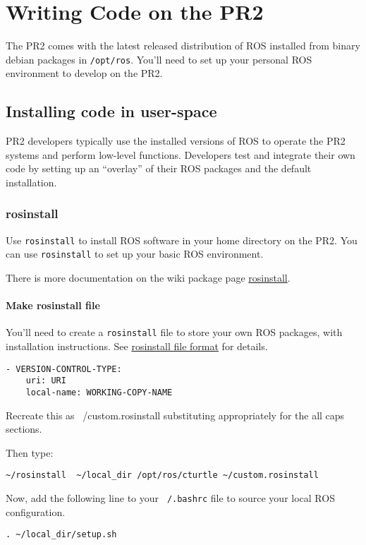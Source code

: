 \chapter{Writing Code on the PR2}

The PR2 comes with the latest released distribution
of ROS installed from binary debian packages in \texttt{/opt/ros}. You'll need to set up your personal ROS environment to develop on the PR2. 


\section{Installing code in user-space}

PR2 developers typically use the installed versions of ROS to operate the PR2 systems and perform low-level functions. Developers test and integrate their own code by setting up an ``overlay'' of their ROS packages and the default installation.

\subsection{rosinstall}

Use \texttt{rosinstall} to install ROS software in your home directory on the PR2. You can use \texttt{rosinstall} to set up your basic ROS environment.

There is more documentation on the wiki package page
\href{http://www.ros.org/wiki/rosinstall}{rosinstall}.

\subsubsection{Make rosinstall file}

You'll need to create a \texttt{rosinstall} file to store your own ROS packages, with installation instructions. See \href{http://www.ros.org/wiki/rosinstall#File\_format}{rosinstall file format} for details.

\begin{verbatim}
- VERSION-CONTROL-TYPE:
    uri: URI
    local-name: WORKING-COPY-NAME
\end{verbatim}
Recreate this as ~/custom.rosinstall substituting appropriately for the all caps sections. 

Then type:
\begin{verbatim}
~/rosinstall  ~/local_dir /opt/ros/cturtle ~/custom.rosinstall
\end{verbatim}

Now, add the following line to your \texttt{~/.bashrc} file to source your local ROS configuration.
\begin{verbatim}
. ~/local_dir/setup.sh
\end{verbatim}

